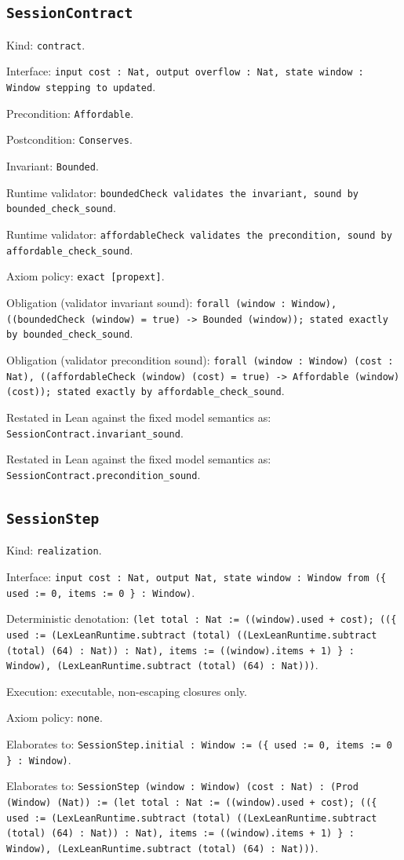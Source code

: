 \documentclass[11pt]{article}
\begin{document}
\subsection*{\texttt{SessionContract}}
\noindent Kind: \texttt{contract}.\par
\noindent Interface: \texttt{input cost : Nat, output overflow : Nat, state window : Window stepping to updated}.\par
\noindent Precondition: \texttt{Affordable}.\par
\noindent Postcondition: \texttt{Conserves}.\par
\noindent Invariant: \texttt{Bounded}.\par
\noindent Runtime validator: \texttt{boundedCheck validates the invariant, sound by bounded\_check\_sound}.\par
\noindent Runtime validator: \texttt{affordableCheck validates the precondition, sound by affordable\_check\_sound}.\par
\noindent Axiom policy: \texttt{exact [propext]}.\par
\noindent Obligation (validator invariant sound): \texttt{forall (window : Window), ((boundedCheck (window) = true) -> Bounded (window)); stated exactly by bounded\_check\_sound}.\par
\noindent Obligation (validator precondition sound): \texttt{forall (window : Window) (cost : Nat), ((affordableCheck (window) (cost) = true) -> Affordable (window) (cost)); stated exactly by affordable\_check\_sound}.\par
\noindent Restated in Lean against the fixed model semantics as: \texttt{SessionContract.invariant\_sound}.\par
\noindent Restated in Lean against the fixed model semantics as: \texttt{SessionContract.precondition\_sound}.\par
\subsection*{\texttt{SessionStep}}
\noindent Kind: \texttt{realization}.\par
\noindent Interface: \texttt{input cost : Nat, output Nat, state window : Window from (\{ used := 0, items := 0 \} : Window)}.\par
\noindent Deterministic denotation: \texttt{(let total : Nat := ((window).used + cost); ((\{ used := (LexLeanRuntime.subtract (total) ((LexLeanRuntime.subtract (total) (64) : Nat)) : Nat), items := ((window).items + 1) \} : Window), (LexLeanRuntime.subtract (total) (64) : Nat)))}.\par
\noindent Execution: executable, non-escaping closures only.\par
\noindent Axiom policy: \texttt{none}.\par
\noindent Elaborates to: \texttt{SessionStep.initial : Window := (\{ used := 0, items := 0 \} : Window)}.\par
\noindent Elaborates to: \texttt{SessionStep (window : Window) (cost : Nat) : (Prod (Window) (Nat)) := (let total : Nat := ((window).used + cost); ((\{ used := (LexLeanRuntime.subtract (total) ((LexLeanRuntime.subtract (total) (64) : Nat)) : Nat), items := ((window).items + 1) \} : Window), (LexLeanRuntime.subtract (total) (64) : Nat)))}.\par
\end{document}
